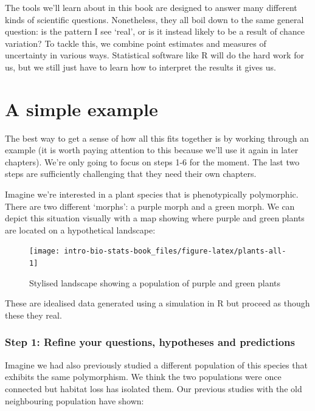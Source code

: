 \documentclass[
]{book}
\begin{document}
The tools we'll learn about in this book are designed to answer many different kinds of scientific questions. Nonetheless, they all boil down to the same general question: is the pattern I see `real', or is it instead likely to be a result of chance variation? To tackle this, we combine point estimates and measures of uncertainty in various ways. Statistical software like R will do the hard work for us, but we still just have to learn how to interpret the results it gives us.

\hypertarget{morph-example}{%
\section{A simple example}\label{morph-example}}

The best way to get a sense of how all this fits together is by working through an example (it is worth paying attention to this because we'll use it again in later chapters). We're only going to focus on steps 1-6 for the moment. The last two steps are sufficiently challenging that they need their own chapters.

Imagine we're interested in a plant species that is phenotypically polymorphic. There are two different `morphs': a purple morph and a green morph. We can depict this situation visually with a map showing where purple and green plants are located on a hypothetical landscape:

\begin{figure}

{\centering \texttt{[image: intro-bio-stats-book\_files/figure-latex/plants-all-1]} 

}

\caption{Stylised landscape showing a population of purple and green plants}\label{fig:plants-all}
\end{figure}

These are idealised data generated using a simulation in R but proceed as though these they real.

\hypertarget{step-1-refine-your-questions-hypotheses-and-predictions-1}{%
\subsubsection*{Step 1: Refine your questions, hypotheses and predictions}\label{step-1-refine-your-questions-hypotheses-and-predictions-1}}

Imagine we had also previously studied a different population of this species that exhibits the same polymorphism. We think the two populations were once connected but habitat loss has isolated them. Our previous studies with the old neighbouring population have shown:
\end{document}
